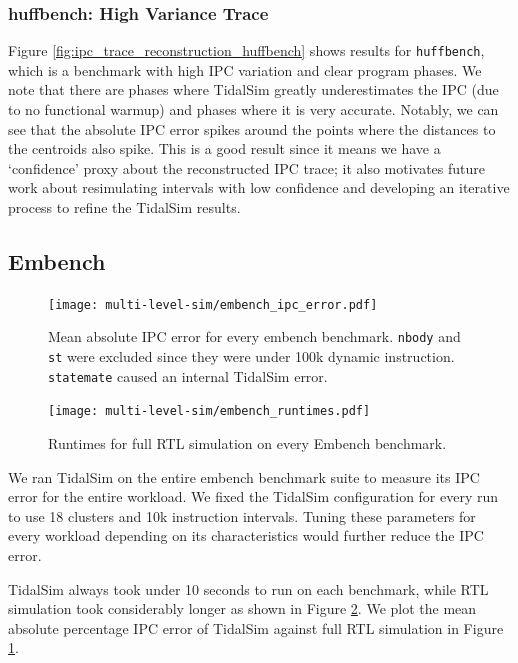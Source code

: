\documentclass[sigplan,nonacm,10pt]{acmart}
\begin{document}
\subsubsection{huffbench: High Variance Trace}

Figure \ref{fig:ipc_trace_reconstruction_huffbench} shows results for \texttt{huffbench}, which is a benchmark with high IPC variation and clear program phases.
We note that there are phases where TidalSim greatly underestimates the IPC (due to no functional warmup) and phases where it is very accurate.
Notably, we can see that the absolute IPC error spikes around the points where the distances to the centroids also spike.
This is a good result since it means we have a `confidence' proxy about the reconstructed IPC trace; it also motivates future work about resimulating intervals with low confidence and developing an iterative process to refine the TidalSim results.

\subsection{Embench}

\begin{figure}
  \texttt{[image: multi-level-sim/embench\_ipc\_error.pdf]}
  \caption{Mean absolute IPC error for every embench benchmark. \texttt{nbody} and \texttt{st} were excluded since they were under 100k dynamic instruction. \texttt{statemate} caused an internal TidalSim error.}
  \label{fig:embench_ipc_error}
\end{figure}

\begin{figure}
  \texttt{[image: multi-level-sim/embench\_runtimes.pdf]}
  \caption{Runtimes for full RTL simulation on every Embench benchmark.}
  \label{fig:embench_runtimes}
\end{figure}

We ran TidalSim on the entire embench benchmark suite to measure its IPC error for the entire workload.
We fixed the TidalSim configuration for every run to use 18 clusters and 10k instruction intervals.
Tuning these parameters for every workload depending on its characteristics would further reduce the IPC error.

TidalSim always took under 10 seconds to run on each benchmark, while RTL simulation took considerably longer as shown in Figure \ref{fig:embench_runtimes}.
We plot the mean absolute percentage IPC error of TidalSim against full RTL simulation in Figure \ref{fig:embench_ipc_error}.
\end{document}
